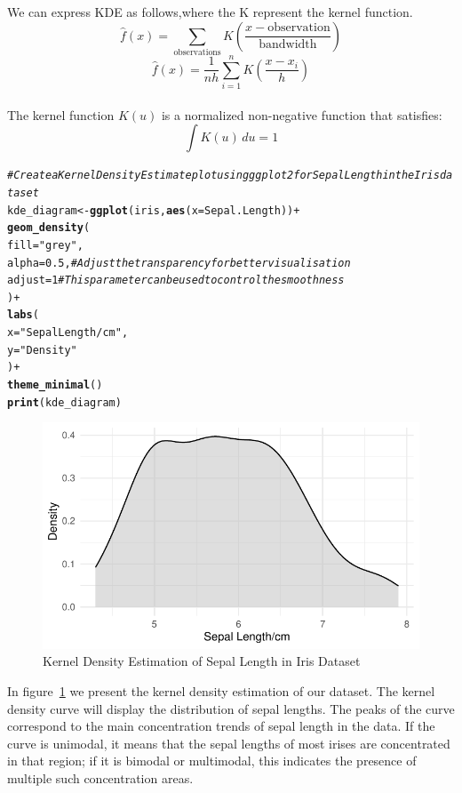 \documentclass{article}\usepackage[]{graphicx}\usepackage[]{xcolor}
\makeatletter
\def\maxwidth{ %
  \ifdim\Gin@nat@width>\linewidth
    \linewidth
  \else
    \Gin@nat@width
  \fi
}
\newcommand{\hlnum}[1]{\textcolor[rgb]{0.686,0.059,0.569}{#1}}%
\newcommand{\hlstr}[1]{\textcolor[rgb]{0.192,0.494,0.8}{#1}}%
\newcommand{\hlcom}[1]{\textcolor[rgb]{0.678,0.584,0.686}{\textit{#1}}}%
\newcommand{\hlopt}[1]{\textcolor[rgb]{0,0,0}{#1}}%
\newcommand{\hlstd}[1]{\textcolor[rgb]{0.345,0.345,0.345}{#1}}%
\newcommand{\hlkwb}[1]{\textcolor[rgb]{0.69,0.353,0.396}{#1}}%
\newcommand{\hlkwc}[1]{\textcolor[rgb]{0.333,0.667,0.333}{#1}}%
\newcommand{\hlkwd}[1]{\textcolor[rgb]{0.737,0.353,0.396}{\textbf{#1}}}%
\newenvironment{kframe}{%
 \def\at@end@of@kframe{}%
 \ifinner\ifhmode%
  \def\at@end@of@kframe{\end{minipage}}%
  \begin{minipage}{\columnwidth}%
 \fi\fi%
 \def\FrameCommand##1{\hskip\@totalleftmargin \hskip-\fboxsep
 \colorbox{shadecolor}{##1}\hskip-\fboxsep
     \hskip-\linewidth \hskip-\@totalleftmargin \hskip\columnwidth}%
 \MakeFramed {\advance\hsize-\width
   \@totalleftmargin\z@ \linewidth\hsize
   \@setminipage}}%
 {\par\unskip\endMakeFramed%
 \at@end@of@kframe}
\newenvironment{knitrout}{}{} %
\makeatother
\begin{document}
\noindent
We can express KDE as follows,where the K represent the kernel function.
$$\hat{f}(x) = \sum_{\text{observations}} K\left(\frac{x - \text{observation}}{\text{bandwidth}}\right)$$
$$\hat{f}(x) = \frac{1}{nh} \sum_{i=1}^{n} K\left(\frac{x - x_i}{h}\right)$$\\
The kernel function \( K(u) \) is a normalized non-negative function that satisfies:
\[ \int K(u) \, du = 1 \]
\begin{knitrout}\scriptsize
{}\color{fgcolor}\begin{kframe}
\begin{alltt}
\hlcom{# Create a Kernel Density Estimate plot using ggplot2 for Sepal Length in the Iris dataset}
\hlstd{kde_diagram} \hlkwb{<-} \hlkwd{ggplot}\hlstd{(iris,} \hlkwd{aes}\hlstd{(}\hlkwc{x} \hlstd{= Sepal.Length))} \hlopt{+}
  \hlkwd{geom_density}\hlstd{(}
    \hlkwc{fill} \hlstd{=} \hlstr{"grey"}\hlstd{,}
    \hlkwc{alpha} \hlstd{=} \hlnum{0.5}\hlstd{,}  \hlcom{# Adjust the transparency for better visualisation}
    \hlkwc{adjust} \hlstd{=} \hlnum{1}  \hlcom{# This parameter can be used to control the smoothness}
  \hlstd{)} \hlopt{+}
  \hlkwd{labs}\hlstd{(}
    \hlkwc{x} \hlstd{=} \hlstr{"Sepal Length/cm"}\hlstd{,}
    \hlkwc{y} \hlstd{=} \hlstr{"Density"}
  \hlstd{)} \hlopt{+}
  \hlkwd{theme_minimal}\hlstd{()}
\hlkwd{print}\hlstd{(kde_diagram)}
\end{alltt}
\end{kframe}\begin{figure}[H]

{\centering \includegraphics[width=\maxwidth]{figure/beamer-kde3-1} 

}

\caption[Kernel Density Estimation of Sepal Length in Iris Dataset]{Kernel Density Estimation of Sepal Length in Iris Dataset}\label{fig:kde3}
\end{figure}

\end{knitrout}
In figure~\ref{fig:kde3} we present the kernel density estimation of our dataset. The kernel density curve will display the distribution of sepal lengths. The peaks of the curve correspond to the main concentration trends of sepal length in the data. If the curve is unimodal, it means that the sepal lengths of most irises are concentrated in that region; if it is bimodal or multimodal, this indicates the presence of multiple such concentration areas.
\end{document}
